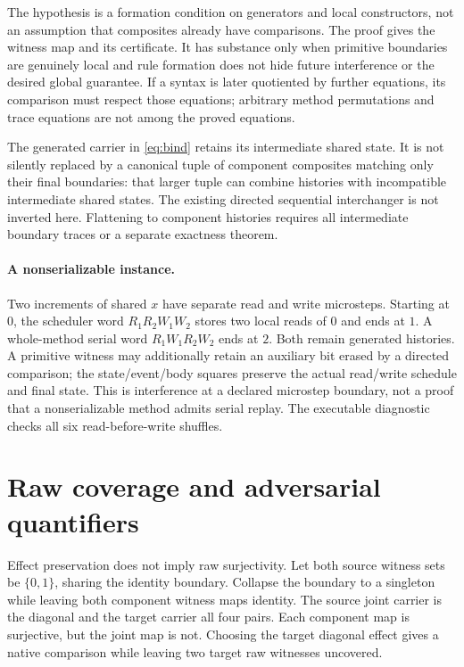\documentclass[11pt]{article}
\begin{document}
The hypothesis is a formation condition on generators and local constructors, not an assumption that composites already have comparisons. The proof gives the witness map and its certificate. It has substance only when primitive boundaries are genuinely local and rule formation does not hide future interference or the desired global guarantee. If a syntax is later quotiented by further equations, its comparison must respect those equations; arbitrary method permutations and trace equations are not among the proved equations.

The generated carrier in \eqref{eq:bind} retains its intermediate shared state. It is not silently replaced by a canonical tuple of component composites matching only their final boundaries: that larger tuple can combine histories with incompatible intermediate shared states. The existing directed sequential interchanger is not inverted here. Flattening to component histories requires all intermediate boundary traces or a separate exactness theorem.

\paragraph{A nonserializable instance.} Two increments of shared $x$ have separate read and write microsteps. Starting at $0$, the scheduler word $R_1R_2W_1W_2$ stores two local reads of $0$ and ends at $1$. A whole-method serial word $R_1W_1R_2W_2$ ends at $2$. Both remain generated histories. A primitive witness may additionally retain an auxiliary bit erased by a directed comparison; the state/event/body squares preserve the actual read/write schedule and final state. This is interference at a declared microstep boundary, not a proof that a nonserializable method admits serial replay. The executable diagnostic checks all six read-before-write shuffles.

\section{Raw coverage and adversarial quantifiers}

Effect preservation does not imply raw surjectivity. Let both source witness sets be $\{0,1\}$, sharing the identity boundary. Collapse the boundary to a singleton while leaving both component witness maps identity. The source joint carrier is the diagonal and the target carrier all four pairs. Each component map is surjective, but the joint map is not. Choosing the target diagonal effect gives a native comparison while leaving two target raw witnesses uncovered.
\end{document}
